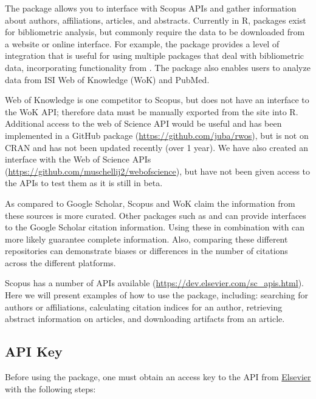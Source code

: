 The  package allows you to interface with Scopus APIs and
gather information about authors, affiliations, articles, and abstracts.
Currently in R, packages exist for bibliometric analysis, but commonly
require the data to be downloaded from a website or online interface.
For example, the  \citep{bibliometrix} package
provides a level of integration that is useful for using multiple
packages that deal with bibliometric data, incorporating functionality
from . The  package also enables
users to analyze data from ISI Web of Knowledge (WoK) and PubMed.

Web of Knowledge is one competitor to Scopus, but 
does not have an interface to the WoK API; therefore data must be
manually exported from the site into R. Additional access to the web of
Science API would be useful and has been implemented in a GitHub package
 (\url{https://github.com/juba/rwos}), but is not on CRAN and
has not been updated recently (over 1 year). We have also created an
interface with the Web of Science APIs
(\url{https://github.com/muschellij2/webofscience}), but have not been
given access to the APIs to test them as it is still in beta.

As compared to Google Scholar, Scopus and WoK claim the information from
these sources is more curated. Other packages such as 
\citep{scholar} and  \citep{gcite} can provide interfaces
to the Google Scholar citation information. Using these in combination
with  can more likely guarantee complete information. Also,
comparing these different repositories can demonstrate biases or
differences in the number of citations across the different platforms.

Scopus has a number of APIs available
(\url{https://dev.elsevier.com/sc_apis.html}). Here we will present
examples of how to use the  package, including: searching
for authors or affiliations, calculating citation indices for an author,
retrieving abstract information on articles, and downloading artifacts
from an article.

\hypertarget{api-key}{%
\subsection{API Key}\label{api-key}}

Before using the package, one must obtain an access key to the API from
\href{https://dev.elsevier.com/apikey/manage}{Elsevier} with the
following steps:

